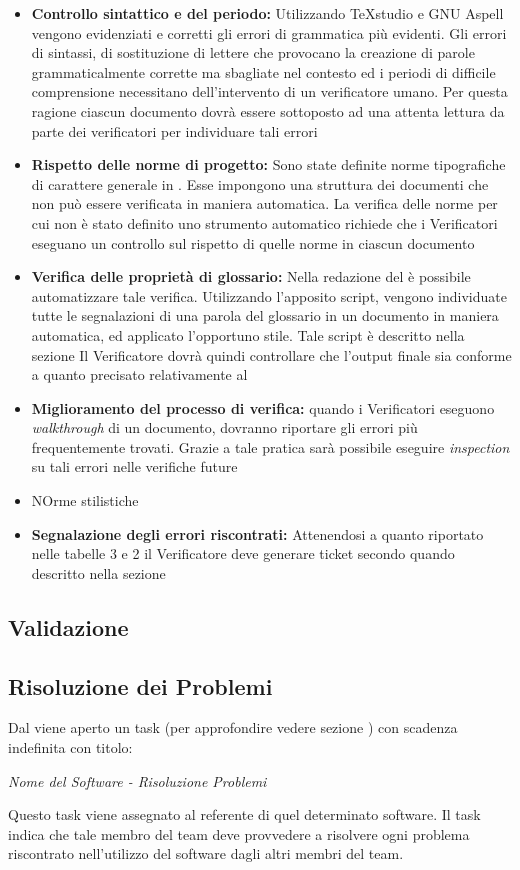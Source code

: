 \documentclass[12pt,a4paper]{article}
\begin{document}
\begin{itemize}
	\item \textbf{Controllo sintattico e del periodo:} Utilizzando TeXstudio e GNU Aspell vengono evidenziati e corretti gli errori di grammatica più evidenti. Gli errori di sintassi, di sostituzione di lettere che provocano la creazione di parole grammaticalmente corrette ma sbagliate nel contesto ed i periodi di difficile comprensione necessitano dell'intervento di un verificatore umano. Per questa ragione ciascun documento dovrà essere sottoposto ad una attenta lettura da parte dei verificatori per individuare tali errori
	\item \textbf{Rispetto delle norme di progetto:} Sono state definite norme tipografiche di carattere generale in \NdP. Esse impongono una struttura dei documenti che non può essere verificata in maniera automatica. La verifica delle norme per cui non è stato definito uno strumento automatico richiede che i Verificatori eseguano un controllo sul rispetto di quelle norme in ciascun documento
	\item \textbf{Verifica delle proprietà di glossario:} Nella redazione del \GlO{} è possibile automatizzare tale verifica. Utilizzando l'apposito script, vengono individuate tutte le segnalazioni di una parola del glossario in un documento in maniera automatica, ed applicato l'opportuno stile. Tale script è descritto nella sezione \TODO{} Il Verificatore dovrà quindi controllare che l'output finale sia conforme a quanto precisato relativamente al \GlO
	\item \textbf{Miglioramento del processo di verifica:} quando i Verificatori eseguono \emph{walkthrough} di un documento, dovranno riportare gli errori più frequentemente trovati. Grazie a tale pratica sarà possibile eseguire \emph{inspection} su tali errori nelle verifiche future
	\item NOrme stilistiche \TODO{}
	\item \textbf{Segnalazione degli errori riscontrati:} Attenendosi a quanto riportato nelle tabelle 3 e 2 il Verificatore deve generare ticket secondo quando descritto nella sezione \TODO{}
\end{itemize}


\subsection{Validazione} %

\subsection{Risoluzione dei Problemi}\label{Risoluzione dei Problemi} %
Dal \PM{} viene aperto un task (per approfondire vedere sezione \TODO) con scadenza indefinita con titolo:
\begin{center}
\emph{Nome del Software - Risoluzione Problemi}
\end{center}
Questo task viene assegnato al referente di quel determinato software. Il task indica che tale membro del team deve provvedere a risolvere ogni problema riscontrato nell'utilizzo del software dagli altri membri del team.
\newpage
\end{document}
